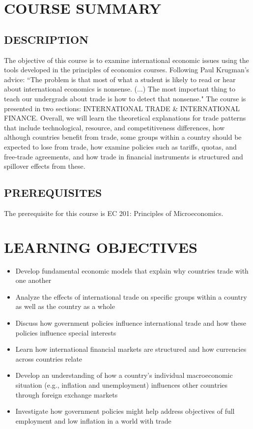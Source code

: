 \documentclass[11pt]{article}
\begin{document}
\selectfont



\bigskip

\section*{COURSE SUMMARY}

\subsection*{DESCRIPTION}
The objective of this course is to examine international economic issues using the tools developed in the principles of economics courses. 
Following Paul Krugman's advice: 
``The problem is that most of what a student is likely to read or hear about international economics is nonsense. 
(...) The most important thing to teach our undergrads about trade is how to detect that nonsense."
The course is presented in two sections: INTERNATIONAL TRADE \& INTERNATIONAL FINANCE.
Overall, we will learn the theoretical explanations for trade patterns that include technological, resource, and competitiveness differences, 
how although countries benefit from trade, some groups within a country should be expected to lose from trade, 
how examine policies such as tariffs, quotas, and free-trade agreements, 
and how trade in financial instruments is structured and spillover effects from these. 

\subsection*{PREREQUISITES}
The prerequisite for this course is EC 201: Principles of Microeconomics. 

\section*{LEARNING OBJECTIVES}
\begin{itemize}
    \item Develop fundamental economic models that explain why countries trade with one another
    \item Analyze the effects of international trade on specific groups within a country as well as the country as a whole
    \item Discuss how government policies influence international trade and how these policies influence special interests 
    \item Learn how international financial markets are structured and how currencies across countries relate
    \item Develop an understanding of how a country's individual macroeconomic situation (e.g., inflation and unemployment) influences other countries through foreign exchange markets
    \item Investigate how government policies might help address objectives of full employment and low inflation in a world with trade
\end{itemize}
\end{document}
